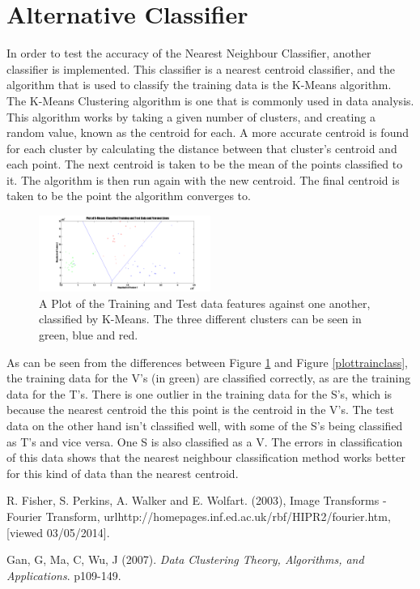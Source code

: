 \documentclass[a4paper]{article}
\begin{document}
\section{Alternative Classifier}
In order to test the accuracy of the Nearest Neighbour Classifier, another classifier is implemented. This classifier is a nearest centroid classifier, and the algorithm that is used to classify the training data is the K-Means algorithm.
\newline
The K-Means Clustering algorithm is one that is commonly used in data analysis. This algorithm works by taking a given number of clusters, and creating a random value, known as the centroid for each. A more accurate centroid is found for each cluster by calculating the distance between that cluster's centroid and each point. The next centroid is taken to be the mean of the points classified to it. The algorithm is then run again with the new centroid. The final centroid is taken to be the point the algorithm converges to. 
\begin{figure}[H]
\centering
\includegraphics[width=0.5\textwidth]{plotkmeans.png}
\caption{\label{fig:plotkmeans}A Plot of the Training and Test data features against one another, classified by K-Means. The three different clusters can be seen in green, blue and red.}
\end{figure}
As can be seen from the differences between Figure \ref{fig:plotkmeans} and Figure \ref{plottrainclass}, the training data for the V's (in green) are classified correctly, as are the training data for the T's. There is one outlier in the training data for the S's, which is because the nearest centroid the this point is the centroid in the V's. The test data on the other hand isn't classified well, with some of the S's being classified as T's and vice versa. One S is also classified as a V. The errors in classification of this data shows that the nearest neighbour classification method works better for this kind of data than the nearest centroid. 
\begin{thebibliography}{1}

R. Fisher, S. Perkins, A. Walker and E. Wolfart. (2003), Image Transforms - Fourier Transform, url{http://homepages.inf.ed.ac.uk/rbf/HIPR2/fourier.htm}, [viewed 03/05/2014].

 Gan, G, Ma, C, Wu, J (2007). {\em Data Clustering Theory, Algorithms, and Applications}. p109-149.

\end{thebibliography}
\end{document}
